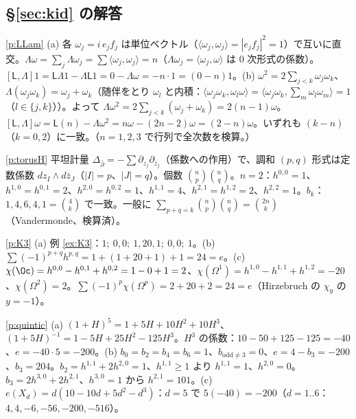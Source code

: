\subsection*{\S\ref{sec:kid} の解答}
\begin{sol}{\ref{p:LLam}}
(a) 各 $\omega_j=i\,e_jf_j$ は単位ベクトル（$\langle\omega_j,\omega_j\rangle=|e_jf_j|^2=1$）で互いに直交。$\Lambda\omega=\sum_j\Lambda\omega_j=\sum\langle\omega_j,\omega_j\rangle=n$（$\Lambda\omega_j=\langle\omega_j,\omega\rangle$ は $0$ 次形式の係数）。$[\mathsf L,\Lambda]1=\mathsf L\Lambda1-\Lambda\mathsf L1=0-\Lambda\omega=-n\cdot1=(0-n)1$。(b) $\omega^2=2\sum_{j<k}\omega_j\omega_k$、$\Lambda(\omega_j\omega_k)=\omega_j+\omega_k$（随伴をとり $\omega_l$ と内積：$\langle\omega_j\omega_k,\omega_l\omega\rangle=\langle\omega_j\omega_k,\sum_m\omega_l\omega_m\rangle=1$（$l\in\{j,k\}$））。よって $\Lambda\omega^2=2\sum_{j<k}(\omega_j+\omega_k)=2(n-1)\omega$。$[\mathsf L,\Lambda]\omega=\mathsf L(n)-\Lambda\omega^2=n\omega-(2n-2)\omega=(2-n)\omega$。いずれも $(k-n)$（$k=0,2$）に一致。（$n=1,2,3$ で行列で全次数を検算。）
\end{sol}
\begin{sol}{\ref{p:torusH}}
平坦計量 $\Delta_{\bar\partial}=-\sum\partial_{z_j}\partial_{\bar z_j}$（係数への作用）で、調和 $(p,q)$ 形式は定数係数 $dz_I\wedge d\bar z_J$（$|I|=p$、$|J|=q$）。個数 $\binom np\binom nq$。$n=2$：$h^{0,0}=1$、$h^{1,0}=h^{0,1}=2$、$h^{2,0}=h^{0,2}=1$、$h^{1,1}=4$、$h^{2,1}=h^{1,2}=2$、$h^{2,2}=1$。$b_k$：$1,4,6,4,1=\binom4k$ で一致。一般に $\sum_{p+q=k}\binom np\binom nq=\binom{2n}k$（Vandermonde、検算済）。
\end{sol}
\begin{sol}{\ref{p:K3}}
(a) 例 \ref{ex:K3}：$1;\ 0,0;\ 1,20,1;\ 0,0;\ 1$。(b) $\sum(-1)^{p+q}h^{p,q}=1+(1+20+1)+1=24=e$。(c) $\chi(\Oc)=h^{0,0}-h^{0,1}+h^{0,2}=1-0+1=2$、$\chi(\Omega^1)=h^{1,0}-h^{1,1}+h^{1,2}=-20$、$\chi(\Omega^2)=2$。$\sum(-1)^p\chi(\Omega^p)=2+20+2=24=e$（Hirzebruch の $\chi_y$ の $y=-1$）。
\end{sol}
\begin{sol}{\ref{p:quintic}}
(a) $(1+H)^5=1+5H+10H^2+10H^3$、$(1+5H)^{-1}=1-5H+25H^2-125H^3$。$H^3$ の係数：$10-50+125-125=-40$、$e=-40\cdot5=-200$。(b) $b_0=b_2=b_4=b_6=1$、$b_{\mathrm{odd}\ne3}=0$、$e=4-b_3=-200$、$b_3=204$。$b_2=h^{1,1}+2h^{2,0}=1$、$h^{1,1}\ge1$ より $h^{1,1}=1$、$h^{2,0}=0$。$b_3=2h^{3,0}+2h^{2,1}$、$h^{3,0}=1$ から $h^{2,1}=101$。(c) $e(X_d)=d(10-10d+5d^2-d^3)$：$d=5$ で $5(-40)=-200$（$d=1..6$：$4,4,-6,-56,-200,-516$）。
\end{sol}
